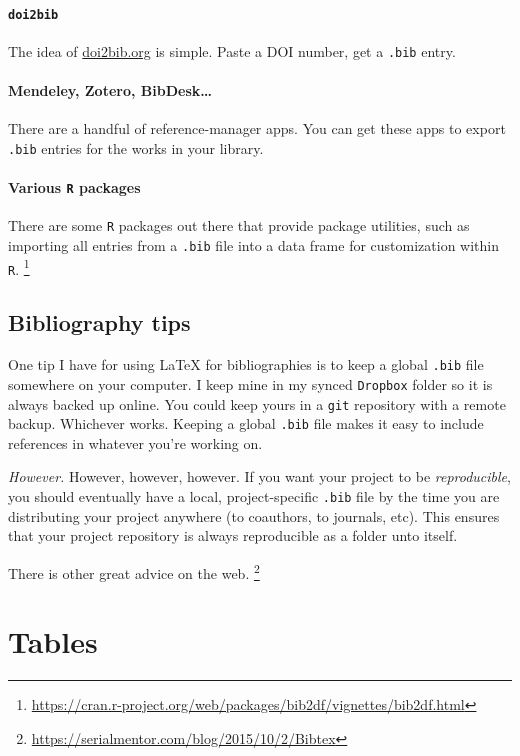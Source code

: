 \documentclass[12pt
              ]{article}
\begin{document}
\paragraph{\texttt{doi2bib}} The idea of \url{doi2bib.org} is simple. Paste a DOI number, get a \texttt{.bib} entry.


\paragraph{Mendeley, Zotero, BibDesk\ldots} There are a handful of reference-manager apps. You can get these apps to export \texttt{.bib} entries for the works in your library.

\paragraph{Various \texttt{R} packages} There are some \texttt{R} packages out there that provide package utilities, such as importing all entries from a \texttt{.bib} file into a data frame for customization within \texttt{R}.%
  \footnote{\url{https://cran.r-project.org/web/packages/bib2df/vignettes/bib2df.html}}



\subsection{Bibliography tips}

One tip I have for using {\LaTeX} for bibliographies is to keep a global \texttt{.bib} file somewhere on your computer. I keep mine in my synced \texttt{Dropbox} folder so it is always backed up online. You could keep yours in a \texttt{git} repository with a remote backup. Whichever works. Keeping a global \texttt{.bib} file makes it easy to include references in whatever you're working on. 

\emph{However.} However, however, however. If you want your project to be \emph{reproducible}, you should eventually have a local, project-specific \texttt{.bib} file by the time you are distributing your project anywhere (to coauthors, to journals, etc). This ensures that your project repository is always reproducible as a folder unto itself. 

There is other great advice on the web.%
  \footnote{\url{https://serialmentor.com/blog/2015/10/2/Bibtex}}
 




\section{Tables}
\end{document}
